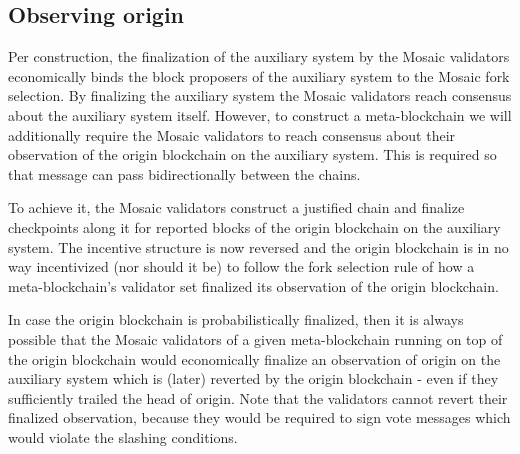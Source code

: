\documentclass[12pt,a4paper]{article}
\begin{document}

\subsection{Observing origin}
\label{observing_origin}

Per construction, the finalization of the auxiliary system by the Mosaic validators economically binds the block proposers of the auxiliary system to the Mosaic fork selection.
By finalizing the auxiliary system the Mosaic validators reach consensus about the auxiliary system itself.
However, to construct a meta-blockchain we will additionally require the Mosaic validators to reach consensus about their observation of the origin blockchain on the auxiliary system.
This is required so that message can pass bidirectionally between the chains.

To achieve it, the Mosaic validators construct a justified chain and finalize checkpoints along it for reported blocks of the origin blockchain on the auxiliary system.
The incentive structure is now reversed and the origin blockchain is in no way incentivized (nor should it be) to follow the fork selection rule of how a meta-blockchain's validator set finalized its observation of the origin blockchain.

In case the origin blockchain is probabilistically finalized, then it is always possible that the Mosaic validators of a given meta-blockchain running on top of the origin blockchain would economically finalize an observation of origin on the auxiliary system which is (later) reverted by the origin blockchain - even if they sufficiently trailed the head of origin.
Note that the validators cannot revert their finalized observation, because they would be required to sign vote messages which would violate the slashing conditions.
\end{document}
